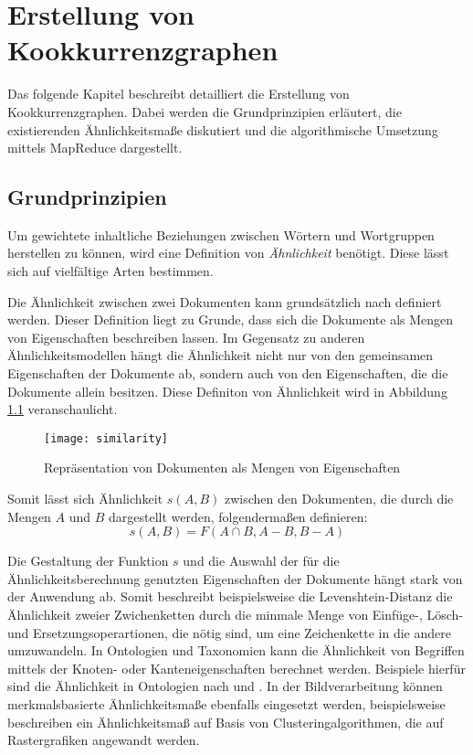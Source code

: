 \chapter{Erstellung von Kookkurrenzgraphen}

Das folgende Kapitel beschreibt detailliert die Erstellung von Kookkurrenzgraphen. Dabei werden die Grundprinzipien erläutert, die existierenden Ähnlichkeitsmaße diskutiert und die algorithmische Umsetzung mittels MapReduce dargestellt.

\section{Grundprinzipien}

Um gewichtete inhaltliche Beziehungen zwischen Wörtern und Wortgruppen herstellen zu können, wird eine Definition von \emph{Ähnlichkeit} benötigt. Diese lässt sich auf vielfältige Arten bestimmen.

Die Ähnlichkeit zwischen zwei Dokumenten kann grundsätzlich nach \textcite{at1977} definiert werden. Dieser Definition liegt zu Grunde, dass sich die Dokumente als Mengen von Eigenschaften beschreiben lassen. Im Gegensatz zu anderen Ähnlichkeitsmodellen hängt die Ähnlichkeit nicht nur von den gemeinsamen Eigenschaften der Dokumente ab, sondern auch von den Eigenschaften, die die Dokumente allein besitzen. Diese Definiton von Ähnlichkeit wird in Abbildung \ref{fig:similarity} veranschaulicht.

\begin{figure}
\centering
\texttt{[image: similarity]}
\caption{Repräsentation von Dokumenten als Mengen von Eigenschaften}
\label{fig:similarity}
\end{figure}

Somit lässt sich Ähnlichkeit \(s(A,B)\) zwischen den Dokumenten, die durch die Mengen \(A\) und \(B\) dargestellt werden, folgendermaßen definieren:
\[s(A,B) = F(A \cap B, A-B, B-A)\]
\label{similarity}

Die Gestaltung der Funktion \(s\) und die Auswahl der für die Ähnlichkeitsberechnung genutzten Eigenschaften der Dokumente hängt stark von der Anwendung ab. Somit beschreibt beispielsweise die Levenshtein-Distanz \cite{vl1966} die Ähnlichkeit zweier Zwichenketten durch die minmale Menge von Einfüge-, Lösch- und Ersetzungsoperartionen, die nötig sind, um eine Zeichenkette in die andere umzuwandeln. In Ontologien und Taxonomien kann die Ähnlichkeit von Begriffen mittels der Knoten- oder Kanteneigenschaften berechnet werden. Beispiele hierfür sind die Ähnlichkeit in Ontologien nach \textcite{pr1995} und \textcite{ps2002}. In der Bildverarbeitung können merkmalsbasierte Ähnlichkeitsmaße ebenfalls eingesetzt werden, beispielsweise beschreiben \textcite{ow2006} ein Ähnlichkeitsmaß auf Basis von Clusteringalgorithmen, die auf Rastergrafiken angewandt werden.

